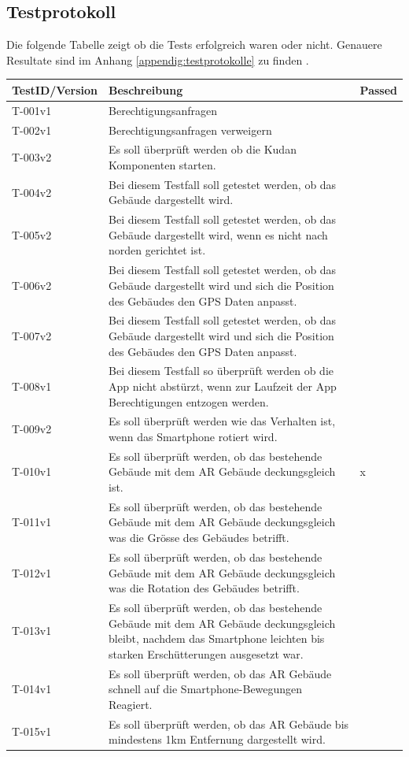 \documentclass[a4paper]{scrreprt}
\begin{document}
\subsection{Testprotokoll}
\label{ch:testprotokoll}
Die folgende Tabelle zeigt ob die Tests erfolgreich waren oder nicht. Genauere Resultate sind im Anhang \ref{appendig:testprotokolle} zu finden . 
\bigbreak

\begin{tabularx}{\textwidth}{|l|X|l|}
\hline
	\textbf{TestID/Version }& \textbf{Beschreibung} & \textbf{Passed} \\
\hline
	T-001v1 & Berechtigungsanfragen & \checkmark \\
\hline
	T-002v1 & Berechtigungsanfragen verweigern & \checkmark \\
\hline
	T-003v2 & Es soll überprüft werden ob die Kudan Komponenten starten. & \checkmark \\
\hline
	T-004v2 & Bei diesem Testfall soll getestet werden, ob das Gebäude dargestellt wird. & \checkmark \\
\hline
	T-005v2 & Bei diesem Testfall soll getestet werden, ob das Gebäude dargestellt wird, wenn es nicht nach norden gerichtet ist. & \checkmark \\
\hline
	T-006v2 & Bei diesem Testfall soll getestet werden, ob das Gebäude dargestellt wird und sich die Position des Gebäudes den GPS Daten anpasst. & \checkmark \\
\hline
	T-007v2 & Bei diesem Testfall soll getestet werden, ob das Gebäude dargestellt wird und sich die Position des Gebäudes den GPS Daten anpasst. & \checkmark \\
\hline
	T-008v1 & Bei diesem Testfall so überprüft werden ob die App nicht abstürzt, wenn zur Laufzeit der App Berechtigungen entzogen werden. & \checkmark \\
\hline
	T-009v2 & Es soll überprüft werden wie das Verhalten ist, wenn das Smartphone rotiert wird. & \checkmark \\
\hline
	T-010v1 & Es soll überprüft werden, ob das bestehende Gebäude mit dem AR Gebäude deckungsgleich ist. & x \\
\hline
	T-011v1 & Es soll überprüft werden, ob das bestehende Gebäude mit dem AR Gebäude deckungsgleich was die Grösse des Gebäudes betrifft. & \checkmark \\
\hline
	T-012v1 & Es soll überprüft werden, ob das bestehende Gebäude mit dem AR Gebäude deckungsgleich was die Rotation des Gebäudes betrifft. & \checkmark \\
\hline
	T-013v1 & Es soll überprüft werden, ob das bestehende Gebäude mit dem AR Gebäude deckungsgleich bleibt, nachdem das Smartphone leichten bis starken Erschütterungen ausgesetzt war. & \checkmark \\
\hline
	T-014v1 & Es soll überprüft werden, ob das AR Gebäude schnell auf die Smartphone-Bewegungen Reagiert. & \checkmark \\
\hline
	T-015v1 & Es soll überprüft werden, ob das AR Gebäude bis mindestens 1km Entfernung dargestellt wird. & \checkmark \\
\hline
\end{tabularx}
\end{document}
